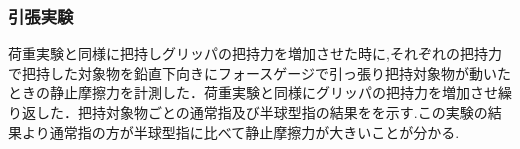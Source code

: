 \subsubsection{引張実験}
荷重実験と同様に把持しグリッパの把持力を増加させた時に,それぞれの把持力で把持した対象物を鉛直下向きにフォースゲージで引っ張り把持対象物が動いたときの静止摩擦力を計測した．荷重実験と同様にグリッパの把持力を増加させ繰り返した．把持対象物ごとの通常指及び半球型指の結果をを示す.この実験の結果より通常指の方が半球型指に比べて静止摩擦力が大きいことが分かる.
\begin{figure}[htbp]
\centering
{}
\hspace{5mm}

\end{figure}
